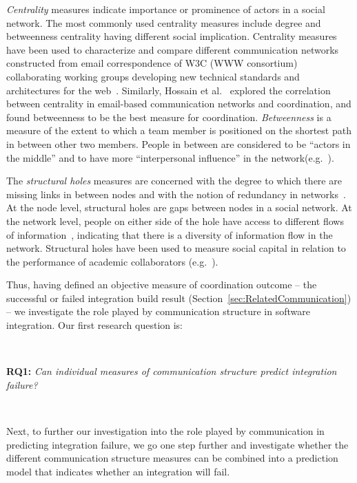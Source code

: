 \documentclass[12pt,oneside]{book}
\begin{document}
\emph{Centrality} measures indicate importance or prominence of actors in a
social network. The most commonly used centrality measures include degree and
betweenness centrality having different social implication. Centrality measures
have been used to characterize and compare different communication networks
constructed from email correspondence of W3C (WWW consortium) collaborating
working groups developing new technical standards and architectures for the
web~\cite{Gloor:2003cikm}. Similarly, Hossain et al.~\cite{hossain:cscw:2006}
explored the correlation between centrality in email-based communication networks
and coordination, and found betweenness to be the best measure for coordination.
\emph{Betweenness} is a measure of the extent to which a team member is
positioned on the shortest path in between other two members. People in between
are considered to be ``actors in the middle'' and to have more ``interpersonal
influence'' in the
network(e.g.~\cite{Gloor:2003cikm,zimmermann:icse:2008,hossain:cscw:2006}).

The \emph{structural holes} measures are concerned with the degree to which there
are missing links in between nodes and with the notion of redundancy in
networks~\cite{Burt:1995vo}. At the node level, structural holes are gaps between
nodes in a social network. At the network level, people on either side of the
hole have access to different flows of information~\cite{Hargadon:1997asq},
indicating that there is a diversity of information flow in the network.
Structural holes have been used to measure social capital in relation to the
performance of academic collaborators (e.g.~\cite{Brambila:PICMET2007}).


Thus, having defined an objective measure of coordination outcome -- the
successful or failed integration build result
(Section~\ref{sec:RelatedCommunication}) -- we investigate the role played by
communication structure in software integration. Our first research question is:

\ \

\noindent\textbf{RQ1:} \emph{Can individual measures of communication structure
predict integration failure?}

\ \

Next, to further our investigation into the role played by communication in
predicting integration failure, we go one step further and investigate whether
the different communication structure measures can be combined into a prediction
model that indicates whether an integration will fail.
\end{document}
